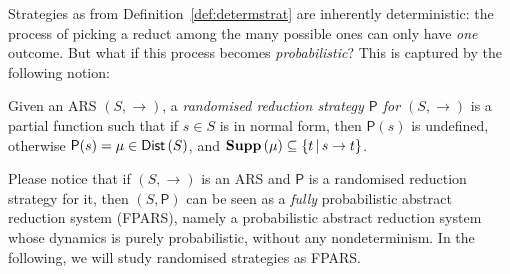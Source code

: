 Strategies as from Definition~\ref{def:determstrat} are inherently
deterministic: the process of picking a reduct among the many possible
ones can only have \emph{one} outcome. But what if this process becomes
\emph{probabilistic}? This is captured by the following notion:
\begin{definition}
	Given an ARS $(S,\rightarrow)$, a
	\emph{randomised reduction strategy $\mathsf{P}$ for $(S,\rightarrow)$}
	is a partial function such that if $s\in S$ is in normal form, then
	$\mathsf{P}(s)$ is undefined, otherwise $\mathsf{P}(s)=\mu\in\textsf{Dist}\left(S\right)$, and
	$\textbf{Supp}\left(\mu\right)\subseteq\{t\,|\,s\rightarrow t\}$.
\end{definition}
Please notice that if $(S,\rightarrow)$ is an ARS and 
$\mathsf{P}$ is a randomised reduction strategy for it,
then $(S,\mathsf{P})$ can be seen as a \emph{fully} probabilistic abstract
reduction system (FPARS), namely a probabilistic abstract reduction
system~\cite{avanzini_probabilistic_2018} whose dynamics is purely
probabilistic, without any nondeterminism. In the following, we will
study randomised strategies as FPARS.

